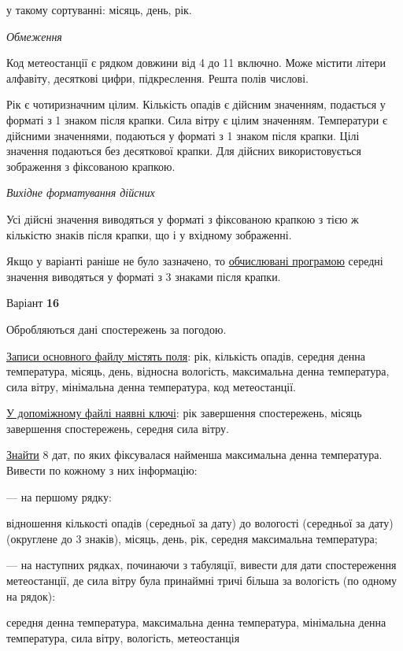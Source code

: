 \documentclass[11pt, ukrainian]{article}
\begin{document}
{\noindent}у такому сортуванні: місяць, день, рік.


\bigskip\textit{Обмеження}

Код метеостанції є рядком довжини від 4 до 11 включно.
Може містити літери алфавіту, десяткові цифри, підкреслення. Решта полів числові.

Рік є чотиризначним цілим.
Кількість опадів є дійсним значенням, подається у форматі з 1 знаком після крапки.
Сила вітру є цілим значенням.
Температури є дійсними значеннями, подаються у форматі з 1 знаком після крапки.
Цілі значення подаються без десяткової крапки.
Для дійсних використовується зображення з фіксованою крапкою.

\textit{Вихідне форматування дійсних}

Усі дійсні значення виводяться у форматі з фіксованою крапкою з тією ж кількістю знаків після крапки, що і у вхідному зображенні.

Якщо у варіанті раніше не було зазначено, то \underline{обчислювані програмою} середні значення виводяться у форматі з 3 знаками після крапки.


\par
\newpage
{\center Варіант  \No \textbf { 16 }\par}
\bigskip
Обробляються дані спостережень за погодою. 

\underline{Записи основного файлу містять поля}: рік, кількість опадів, середня денна температура, місяць, день, відносна вологість, максимальна денна температура, сила вітру, мінімальна денна температура, код метеостанції.

\underline{У допоміжному файлі наявні ключі}: рік завершення спостережень, місяць завершення спостережень, середня сила вітру.

\underline{Знайти} 8 дат, по яких фіксувалася найменша максимальна  денна температура. Вивести по кожному з них інформацію:\par
{\noindent}--- на першому рядку:\par
відношення кількості опадів (середньої за дату) до вологості (середньої за дату) (округлене до 3 знаків), місяць, день, рік, середня максимальна температура;

{\noindent}--- на наступних рядках, починаючи з табуляції, вивести для дати спостереження метеостанції, де сила вітру була принаймні тричі більша за вологість (по одному на рядок):\par
середня денна температура, максимальна денна температура, мінімальна денна температура, сила вітру, вологість, метеостанція
\end{document}
